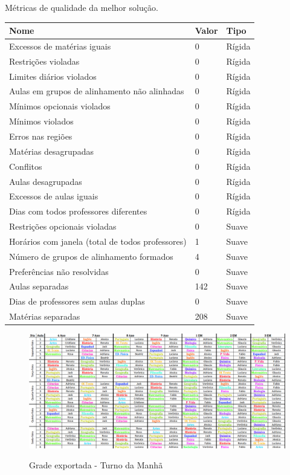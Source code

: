 \begin{quadro}[p]
	\centering
	\caption{Métricas de qualidade da melhor solução.\label{qua:caracteristicas_horario_validacao}}
	\begin{tabular}{|p{8cm}|p{1cm}|p{3cm}|}
		\hline
		\textbf{Nome} & \textbf{Valor} & \textbf{Tipo} \\
		\hline
		Excessos de matérias iguais & 0 & Rígida \\
		\hline
		Restrições violadas & 0 & Rígida \\
		\hline
		Limites diários violados & 0 & Rígida \\
		\hline
		Aulas em grupos de alinhamento não alinhadas & 0 & Rígida \\
		\hline
		Mínimos opcionais violados & 0 & Rígida \\
		\hline
		Mínimos violados & 0 & Rígida \\
		\hline
		Erros nas regiões & 0 & Rígida \\
		\hline
		Matérias desagrupadas & 0 & Rígida \\
		\hline
		Conflitos & 0 & Rígida \\
		\hline
		Aulas desagrupadas & 0 & Rígida \\
		\hline
		Excessos de aulas iguais & 0 & Rígida \\
		\hline
		Dias com todos professores diferentes & 0 & Rígida \\
		\hline
		Restrições opcionais violadas & 0 & Suave \\
		\hline
		Horários com janela (total de todos professores) & 1 & Suave \\
		\hline
		Número de grupos de alinhamento formados & 4 & Suave \\
		\hline
		Preferências não resolvidas & 0 & Suave \\
		\hline
		Aulas separadas & 142 & Suave \\
		\hline
		Dias de professores sem aulas duplas & 0 & Suave \\
		\hline
		Matérias separadas & 208 & Suave \\
		\hline
	\end{tabular}
\end{quadro}

\begin{figure}[p]
	\centering
	\caption{Grade exportada - Turno da Manhã}
	\includegraphics[width=1\textwidth]{./dados/figuras/planilha_exportada_manha}
	\label{fig:planilha_exportada_manha}
\end{figure}

